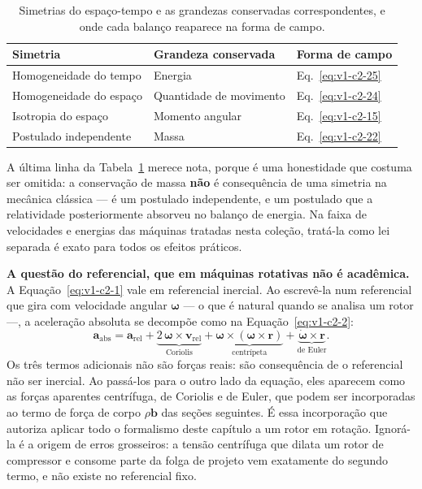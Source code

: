 \documentclass[12pt,a4paper]{article}
\numberwithin{equation}{section}
\numberwithin{table}{section}
\numberwithin{figure}{section}
\begin{document}
\begin{table}[H]
\centering
\caption[Simetrias e grandezas conservadas]{Simetrias do espaço-tempo e as
grandezas conservadas correspondentes, e onde cada balanço reaparece na forma
de campo.}
\label{tab:v1-c2-1}
\small
\begin{tabular}{@{}lll@{}}
\toprule
\textbf{Simetria} & \textbf{Grandeza conservada} & \textbf{Forma de campo} \\
\midrule
Homogeneidade do tempo & Energia & Eq.~\eqref{eq:v1-c2-25} \\
Homogeneidade do espaço & Quantidade de movimento & Eq.~\eqref{eq:v1-c2-24} \\
Isotropia do espaço & Momento angular & Eq.~\eqref{eq:v1-c2-15} \\
Postulado independente & Massa & Eq.~\eqref{eq:v1-c2-22} \\
\bottomrule
\end{tabular}
\end{table}

A última linha da Tabela~\ref{tab:v1-c2-1} merece nota, porque é uma
honestidade que costuma ser omitida: a conservação de massa \textbf{não} é
consequência de uma simetria na mecânica clássica --- é um postulado
independente, e um postulado que a relatividade posteriormente absorveu no
balanço de energia. Na faixa de velocidades e energias das máquinas tratadas
nesta coleção, tratá-la como lei separada é exato para todos os efeitos
práticos.

\textbf{A questão do referencial, que em máquinas rotativas não é acadêmica.}
A Equação~\eqref{eq:v1-c2-1} vale em referencial inercial. Ao escrevê-la num
referencial que gira com velocidade angular $\boldsymbol{\omega}$ --- o que é
natural quando se analisa um rotor ---, a aceleração absoluta se decompõe como
na Equação~\eqref{eq:v1-c2-2}:
\begin{equation}\label{eq:v1-c2-2}
\mathbf{a}_{\text{abs}} = \mathbf{a}_{\text{rel}} +
\underbrace{2\,\boldsymbol{\omega}\times\mathbf{v}_{\text{rel}}}_{\text{Coriolis}} +
\underbrace{\boldsymbol{\omega}\times(\boldsymbol{\omega}\times\mathbf{r})}_{\text{centrípeta}} +
\underbrace{\dot{\boldsymbol{\omega}}\times\mathbf{r}}_{\text{de Euler}} .
\end{equation}
Os três termos adicionais não são forças reais: são consequência de o
referencial não ser inercial. Ao passá-los para o outro lado da equação, eles
aparecem como as forças aparentes centrífuga, de Coriolis e de Euler, que
podem ser incorporadas ao termo de força de corpo $\rho\mathbf{b}$ das seções
seguintes. É essa incorporação que autoriza aplicar todo o formalismo deste
capítulo a um rotor em rotação. Ignorá-la é a origem de erros grosseiros: a
tensão centrífuga que dilata um rotor de compressor e consome parte da folga de
projeto vem exatamente do segundo termo, e não existe no referencial fixo.
\end{document}
